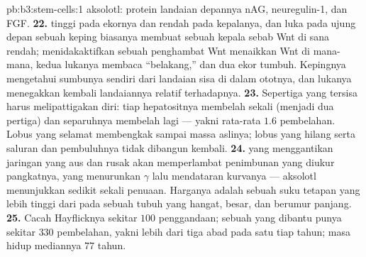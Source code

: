 \begin{solution}{pb:b3:stem-cells:1}
aksolotl: protein landaian depannya nAG, neuregulin-1, dan FGF.
\textbf{22.}  tinggi pada ekornya dan rendah pada kepalanya, dan
luka pada ujung depan sebuah keping biasanya membuat sebuah kepala sebab Wnt
di sana rendah; menidakaktifkan sebuah penghambat Wnt menaikkan Wnt di mana-mana,
kedua lukanya membaca ``belakang,'' dan dua ekor tumbuh. Kepingnya mengetahui
sumbunya sendiri dari landaian sisa di dalam ototnya, dan lukanya
menegakkan kembali landaiannya relatif terhadapnya.
\textbf{23.} Sepertiga yang tersisa harus melipattigakan diri: tiap hepatositnya membelah
sekali (menjadi dua pertiga) dan separuhnya membelah lagi --- yakni rata-rata $1.6$ pembelahan.
Lobus yang selamat membengkak sampai massa aslinya; lobus yang hilang serta
saluran dan pembuluhnya tidak dibangun kembali.
\textbf{24.}  yang menggantikan jaringan yang aus dan rusak akan
memperlambat penimbunan yang diukur pangkatnya, yang menurunkan $\gamma$ lalu
mendataran kurvanya --- aksolotl menunjukkan sedikit sekali penuaan. Harganya
adalah sebuah suku tetapan yang lebih tinggi dari  pada sebuah tubuh yang hangat, besar, dan
berumur panjang.
\textbf{25.} Cacah Hayflicknya sekitar $100$ penggandaan; sebuah  yang dibantu
 punya sekitar $330$ pembelahan, yakni lebih dari tiga abad pada satu tiap
tahun; masa hidup mediannya $77$ tahun.
\end{solution}
